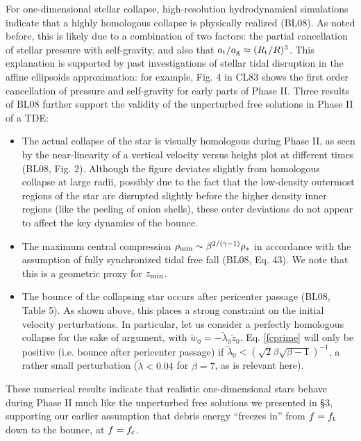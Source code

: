 \documentclass[useAMS, twocolumn, usenatbib]{mn2e}
\begin{document}
For one-dimensional stellar collapse, high-resolution hydrodynamical simulations indicate that a highly homologous collapse is physically realized (BL08).  As noted before, this is likely due to a combination of two factors: the partial cancellation of stellar pressure with self-gravity, and also that $a_{\rm t}/a_{\rm g}\approx(R_{\rm t}/R)^3$.  This explanation is supported by past investigations of stellar tidal disruption in the affine ellipsoids approximation: for example, Fig. 4 in CL83 shows the first order cancellation of pressure and self-gravity for early parts of Phase II.  Three results of BL08 further support the validity of the unperturbed free solutions in Phase II of a TDE:
\begin{itemize}
\item The actual collapse of the star is visually homologous during Phase II, as seen by the near-linearity of a vertical velocity versus height plot at different times (BL08, Fig. 2).  Although the figure deviates slightly from homologous collapse at large radii, possibly due to the fact that the low-density outermost regions of the star are disrupted slightly before the higher density inner regions (like the peeling of onion shells), these outer deviations do not appear to affect the key dynamics of the bounce.
\item The maximum central compression $\rho_{\rm min}\sim \beta^{2/(\gamma-1)}\rho_*$ in accordance with the assumption of fully synchronized tidal free fall (BL08, Eq. 43).  We note that this is a geometric proxy for $z_{\rm min}$.
\item The bounce of the collapsing star occurs after pericenter passage (BL08, Table 5).  As shown above, this places a strong constraint on the initial velocity perturbations.  In particular, let us consider a perfectly homologous collapse for the sake of argument, with $\tilde{w}_0=-\tilde{\lambda}_0 \tilde{z}_0$.  Eq. \ref{fcprime} will only be positive (i.e. bounce after pericenter passage) if $\tilde{\lambda}_0<(\sqrt{2}\beta\sqrt{\beta-1})^{-1}$, a rather small perturbation ($\tilde{\lambda} <0.04$ for $\beta=7$, as is relevant here).
\end{itemize}

These numerical results indicate that realistic one-dimensional stars behave during Phase II much like the unperturbed free solutions we presented in \S 3, supporting our earlier assumption that debris energy ``freezes in'' from $f=f_{\rm t}$ down to the bounce, at $f=f_{\rm c}$.  
\end{document}
